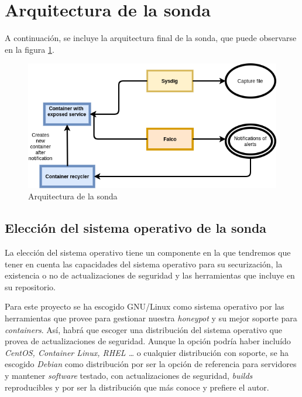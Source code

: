 \section{Arquitectura de la sonda}

A continuación, se incluye la arquitectura final de la sonda, que puede observarse en la figura \ref{fig:arquitectura-sonda}.

\begin{figure}[h]
    \centering
      \includegraphics[scale=0.5]{images/probe_architecture}
    \caption{Arquitectura de la sonda}
    \label{fig:arquitectura-sonda}
  \end{figure}

\subsection{Elección del sistema operativo de la sonda}
\label{subsec:sonda-so}
  
La elección del sistema operativo tiene un componente en la que tendremos que tener en cuenta las capacidades del sistema operativo para su securización,
la existencia o no de actualizaciones de seguridad y las herramientas que incluye en su repositorio.

Para este proyecto se ha escogido GNU/Linux como sistema operativo por las herramientas que provee para gestionar nuestra \emph{honeypot} y su mejor soporte
para \emph{containers}. Así, habrá que escoger una distribución del sistema operativo que provea de actualizaciones de seguridad. Aunque la opción podría haber incluído \emph{CentOS, Container Linux, RHEL \ldots} o cualquier distribución con soporte, se ha escogido \emph{Debian} como distribución por ser la opción de referencia para servidores y mantener \emph{software} testado, con actualizaciones de seguridad, 
\emph{builds} reproducibles y por ser la distribución que más conoce y prefiere el autor.


